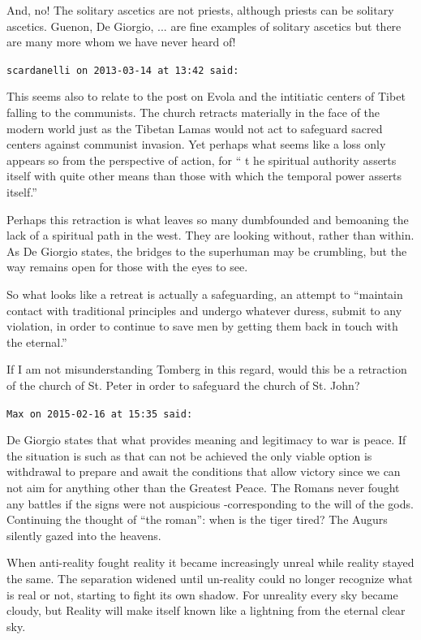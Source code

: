 \begin{footnotesize}
\begin{sffamily}
And, no! The solitary ascetics are not priests, although priests can be solitary ascetics. Guenon, De Giorgio, ... are fine examples of solitary ascetics but there are many more whom we have never heard of!

\hfill

\texttt{scardanelli on 2013-03-14 at 13:42 said:}

This seems also to relate to the post on Evola and the intitiatic centers of Tibet falling to the communists. The church retracts materially in the face of the modern world just as the Tibetan Lamas would not act to safeguard sacred centers against communist invasion. Yet perhaps what seems like a loss only appears so from the perspective of action, for `` t he spiritual authority asserts itself with quite other means than those with which the temporal power asserts itself.''

Perhaps this retraction is what leaves so many dumbfounded and bemoaning the lack of a spiritual path in the west. They are looking without, rather than within. As De Giorgio states, the bridges to the superhuman may be crumbling, but the way remains open for those with the eyes to see.

So what looks like a retreat is actually a safeguarding, an attempt to ``maintain contact with traditional principles and undergo whatever duress, submit to any violation, in order to continue to save men by getting them back in touch with the eternal.''

If I am not misunderstanding Tomberg in this regard, would this be a retraction of the church of St. Peter in order to safeguard the church of St. John?

\hfill

\texttt{Max on 2015-02-16 at 15:35 said:}

De Giorgio states that what provides meaning and legitimacy to war is peace. If the situation is such as that can not be achieved the only viable option is withdrawal to prepare and await the conditions that allow victory since we can not aim for anything other than the Greatest Peace. The Romans never fought any battles if the signs were not auspicious -corresponding to the will of the gods. Continuing the thought of ``the roman'': when is the tiger tired? The Augurs silently gazed into the heavens.

When anti-reality fought reality it became increasingly unreal while reality stayed the same. The separation widened until un-reality could no longer recognize what is real or not, starting to fight its own shadow. For unreality every sky became cloudy, but Reality will make itself known like a lightning from the eternal clear sky.

\end{sffamily}
\end{footnotesize}

